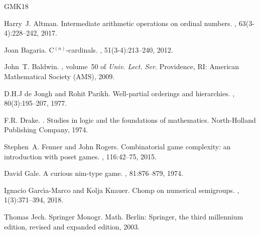 \documentclass[reqno]{amsart}
\theoremstyle{definition}
\theoremstyle{definition}
\theoremstyle{plain} %
\begin{document}
\begin{thebibliography}{GMK18}

Harry~J. Altman.
\newblock Intermediate arithmetic operations on ordinal numbers.
, 63(3-4):228--242, 2017.

Joan Bagaria.
\newblock C$^{(n)}$-cardinals.
, 51(3-4):213--240, 2012.

John~T. Baldwin.
, volume~50 of {\em Univ. Lect. Ser.}
\newblock Providence, RI: American Mathematical Society (AMS), 2009.

D.H.J {de Jongh} and Rohit Parikh.
\newblock Well-partial orderings and hierarchies.
, 80(3):195--207, 1977.

F.R. Drake.
.
\newblock Studies in logic and the foundations of mathematics. North-Holland Publishing Company, 1974.

Stephen~A. Fenner and John Rogers.
\newblock Combinatorial game complexity: an introduction with poset games.
, 116:42--75, 2015.

David Gale.
\newblock A curious nim-type game.
, 81:876--879, 1974.

Ignacio Garc{\'\i}a-Marco and Kolja Knauer.
\newblock Chomp on numerical semigroups.
, 1(3):371--394, 2018.

Thomas Jech.
\newblock Springer Monogr. Math. Berlin: Springer, the third millennium edition, revised and expanded edition, 2003.
\end{thebibliography}
\vspace{5mm}
\end{document}
